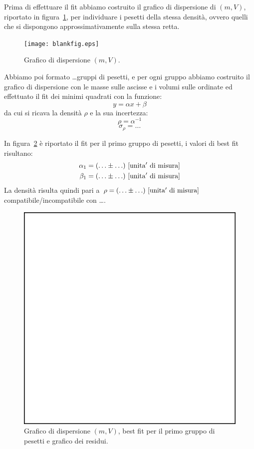 \documentclass{article}
\begin{document}
Prima di effettuare il fit abbiamo costruito il grafico di dispersione di $(m,V)$, riportato in figura~\ref{fig:dispersione},
per individuare i pesetti della stessa densit\`a, ovvero quelli che si dispongono approssimativamente sulla stessa retta.

\begin{figure}
    \centering
     \texttt{[image: blankfig.eps]}
    \caption{Grafico di dispersione $(m,V)$.}
    \label{fig:dispersione}
\end{figure}

Abbiamo poi formato \ldots gruppi di pesetti, e per ogni gruppo abbiamo costruito il grafico di dispersione con le masse sulle ascisse e i volumi sulle ordinate ed effettuato il fit dei minimi quadrati con la funzione:
\begin{equation}
    y = \alpha x + \beta
\end{equation}
da cui si ricava la densit\`a $\rho$ e la sua incertezza:
\begin{equation}
    \rho = \alpha^{-1}
\end{equation}
\begin{equation}
    \sigma_{\rho} = \ldots
\end{equation}

In figura~\ref{fig:density1} \`e riportato il  fit per il primo gruppo di pesetti, i valori di best fit risultano:
\begin{eqnarray}
    \alpha_1 = (\ldots \pm \ldots)\ \rm [unita'\ di\ misura] \\
    \beta_1 = (\ldots \pm \ldots)\ \rm [unita'\ di\ misura]
\end{eqnarray}
La densit\`a risulta quindi pari a $\rho = (\ldots\pm\ldots)\ \rm [unita'\ di\ misura]$ compatibile/incompatibile con \ldots.

\begin{figure}
    \centering
     \includegraphics[width=0.5\linewidth]{blankfig.pdf}
    \caption{Grafico di dispersione $(m,V)$, best fit per il primo gruppo di pesetti e grafico dei residui.}
    \label{fig:density1}
\end{figure}
\end{document}
